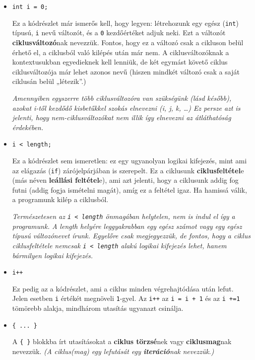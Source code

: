 \documentclass[a4paper]{article}
\begin{document}
	\begin{itemize}
		\item \lstinline{int i = 0;}
		
		Ez a kódrészlet már ismerős kell, hogy legyen: létrehozunk egy egész (\lstinline{int}) típusú, \lstinline{i} nevű változót, és a \lstinline{0} kezdőértéket adjuk neki. Ezt a változót \textbf{ciklusváltozó}nak nevezzük. Fontos, hogy ez a változó csak a cikluson belül érhető el, a ciklusból való kilépés után már nem. A ciklusváltozóknak a kontextusukban egyedieknek kell lenniük, de két egymást követő ciklus ciklusváltozója már lehet azonos nevű (hiszen mindkét változó csak a saját ciklusán belül „létezik”.)
		
		\emph{Amennyiben egyszerre több ciklusváltozóra van szükségünk (lásd később), azokat i-től kezdődő kisbetűkkel szokás elnevezni (i, j, k, …) Ez persze azt is jelenti, hogy nem-ciklusváltozókat nem illik így elnevezni az átláthatóság érdekében.}
		
		\item \lstinline{i < length;}
		
		Ez a kódrészlet sem ismeretlen: ez egy ugyanolyan logikai kifejezés, mint ami az elágazás (\lstinline{if}) zárójelpárjában is szerepelt. Ez a ciklusunk \textbf{ciklusfeltétel}e (más néven \textbf{leállási feltétel}e), ami azt jelenti, hogy a ciklusunk addig fog futni (addig fogja ismételni magát), amíg ez a feltétel igaz. Ha hamissá válik, a programunk kilép a ciklusból.
		
		\emph{Természetesen az \lstinline{i < length} önmagában helytelen, nem is indul el így a programunk. A length helyére leggyakrabban egy egész számot vagy egy egész típusú változónevet írunk. Egyelőre csak megjegyezzük, de fontos, hogy a ciklus ciklusfeltétele nemcsak \lstinline{i < length} alakú logikai kifejezés lehet, hanem bármilyen logikai kifejezés.}
		
		\item \lstinline{i++}
		
		Ez pedig az a kódrészlet, ami a ciklus minden végrehajtódása után lefut. Jelen esetben \lstinline{i} értékét megnöveli \lstinline{1}-gyel. Az \lstinline{i++} az \lstinline{i = i + 1} és az \lstinline{i +=1} tömörebb alakja, mindhárom utasítás ugyanazt csinálja.
		
		\item \lstinline!{ ... }!
		
		A \lstinline!{ }! blokkba írt utasításokat a \textbf{ciklus törzsé}nek vagy \textbf{ciklusmag}nak nevezzük. \emph{(A ciklus(mag) egy lefutását egy \textbf{iteráció}nak nevezzük.)}
		
	\end{itemize}
	
\end{document}
